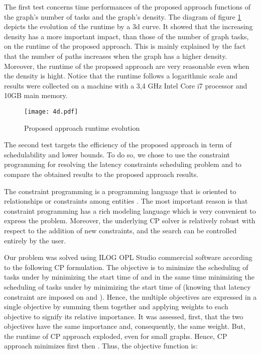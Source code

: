 \documentclass{ijcaArticle}
\begin{document}
The first test concerns time performances of the proposed approach functions of the graph\rq{}s number of tasks and the graph\rq{}s density. The diagram of figure \ref{3dcurve} depicts the evolution of the runtime by a 3d curve. It showed that the increasing density has a  more important impact, than those of the number of graph tasks, on the runtime of the proposed approach. This is mainly explained by the fact that the number of paths increases when the graph has a higher density.  Moreover, the runtime of the proposed approach are very reasonable even when the density is  hight.  Notice that the runtime follows a logarithmic scale and results were collected on a machine with a 3,4 GHz Intel Core i7 processor
and 10GB main memory.   


\begin{figure}[h!] 
\begin{center} 
\texttt{[image: 4d.pdf]} 
\caption{Proposed approach runtime evolution} 
\label{3dcurve} 
\end{center} 
\end{figure}


The second test targets the efficiency of the proposed approach in term of schedulability and lower bounds. To do so, we chose to use the constraint programming for resolving the latency constraints scheduling problem and to compare the obtained results to the proposed approach results. 

The constraint programming is a programming language that is oriented to relationships or constraints among entities \cite{Apt:2003:PCP:1237975}.  The most important reason is that constraint programming has a rich modeling language which is very convenient to express the problem. Moreover, the underlying CP solver is relatively robust with respect to the addition of new constraints, and the search can be controlled entirely by the user.

Our problem was solved using ILOG OPL Studio commercial software according to the following CP formulation. The objective is to minimize the scheduling of tasks under  by minimizing the start time of  and in the same time minimizing the scheduling of tasks under  by minimizing the start time of   (knowing that latency constraint are imposed on  and ). Hence, the multiple objectives are expressed in a single objective by summing them together and applying weights to each objective to signify its relative importance. It was assessed, first, that the two objectives have the same importance and, consequently, the same weight. But, the runtime of CP approach exploded, even for small graphs. Hence, CP approach minimizes  first then . Thus, the objective function is:  
\end{document}
